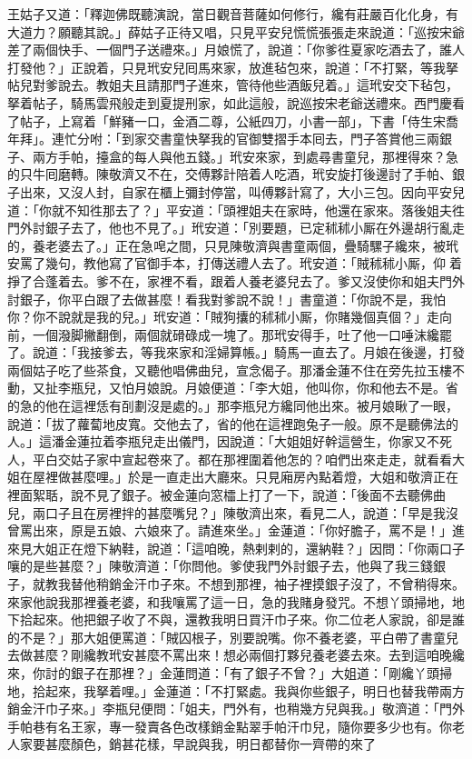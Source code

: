 王姑子又道：「釋迦佛既聽演說，當日觀音菩薩如何修行，纔有莊嚴百化化身，有大道力？願聽其說。」薛姑子正待又唱，只見平安兒慌慌張張走來說道：「巡按宋爺差了兩個快手、一個門子送禮來。」月娘慌了，說道：「你爹徃夏家吃酒去了，誰人打發他？」正說着，只見玳安兒囘馬來家，放進毡包來，說道：「不打緊，等我拏帖兒對爹說去。教姐夫且請那門子進來，管待他些酒飯兒着。」{}這玳安交下毡包，拏着帖子，騎馬雲飛般走到夏提刑家，如此這般，說巡按宋老爺送禮來。西門慶看了帖子，上寫着「鮮豬一口，金酒二尊，公紙四刀，小書一部」，下書「侍生宋喬年拜」。連忙分咐：「到家交書童快拏我的官御雙摺手本囘去，門子答賞他三兩銀子、兩方手帕，擡盒的每人與他五錢。」玳安來家，到處尋書童兒，那裡得來？急的只牛囘磨轉。陳敬濟又不在，交傅夥計陪着人吃酒，玳安旋打後邊討了手帕、銀子出來，又沒人封，自家在櫃上彌封停當，叫傅夥計寫了，大小三包。因向平安兒道：「你就不知徃那去了？」平安道：「頭裡姐夫在家時，他還在家來。落後姐夫徃門外討銀子去了，他也不見了。」玳安道：「別要題，已定秫秫小厮在外邊胡行亂走的，養老婆去了。」正在急唣之間，只見陳敬濟與書童兩個，疊騎騾子纔來，被玳安罵了幾句，教他寫了官御手本，打傳送禮人去了。玳安道：「賊秫秫小厮，仰𢵞着掙了合蓬着去。{}爹不在，家裡不看，跟着人養老婆兒去了。爹又沒使你和姐夫門外討銀子，你平白跟了去做甚麼！看我對爹說不說！」書童道：「你說不是，我怕你？你不說就是我的兒。」{}玳安道：「賊狗攮的秫秫小厮，你賭幾個真個？」走向前，一個潑脚撇翻倒，兩個就磆碌成一塊了。那玳安得手，吐了他一口唾沫纔罷了。說道：「我接爹去，等我來家和淫婦算帳。」騎馬一直去了。月娘在後邊，打發兩個姑子吃了些茶食，又聽他唱佛曲兒，宣念偈子。那潘金蓮不住在旁先拉玉樓不動，又扯李瓶兒，又怕月娘說。月娘便道：「李大姐，他叫你，你和他去不是。省的急的他在這裡恁有㓦劃沒是處的。」那李瓶兒方纔同他出來。被月娘瞅了一眼，說道：「拔了蘿蔔地皮寬。交他去了，省的他在這裡跑兔子一般。原不是聽佛法的人。」{}這潘金蓮拉着李瓶兒走出儀門，因說道：「大姐姐好幹這營生，你家又不死人，平白交姑子家中宣起卷來了。都在那裡圍着他怎的？咱們出來走走，就看看大姐在屋裡做甚麼哩。」於是一直走出大廳來。只見廂房內點着燈，大姐和敬濟正在裡面絮聒，說不見了銀子。被金蓮向窓櫺上打了一下，說道：「後面不去聽佛曲兒，兩口子且在房裡拌的甚麼嘴兒？」陳敬濟出來，看見二人，說道：「早是我沒曾罵出來，原是五娘、六娘來了。請進來坐。」金蓮道：「你好膽子，罵不是！」進來見大姐正在燈下納鞋，說道：「這咱晚，熱剌剌的，還納鞋？」因問：「你兩口子嚷的是些甚麼？」陳敬濟道：「你問他。爹使我門外討銀子去，他與了我三錢銀子，就教我替他稍銷金汗巾子來。不想到那裡，袖子裡摸銀子沒了，不曾稍得來。來家他說我那裡養老婆，和我嚷罵了這一日，急的我賭身發咒。不想丫頭掃地，地下拾起來。他把銀子收了不與，還教我明日買汗巾子來。{}你二位老人家說，卻是誰的不是？」那大姐便罵道：「賊囚根子，別要說嘴。你不養老婆，平白帶了書童兒去做甚麼？剛纔教玳安甚麼不罵出來！想必兩個打夥兒養老婆去來。去到這咱晚纔來，你討的銀子在那裡？」金蓮問道：「有了銀子不曾？」大姐道：「剛纔丫頭掃地，拾起來，我拏着哩。」金蓮道：「不打緊處。我與你些銀子，明日也替我帶兩方銷金汗巾子來。」李瓶兒便問：「姐夫，門外有，也稍幾方兒與我。」敬濟道：「門外手帕巷有名王家，專一發賣各色改樣銷金點翠手帕汗巾兒，隨你要多少也有。你老人家要甚麼顏色，銷甚花樣，早說與我，明日都替你一齊帶的來了